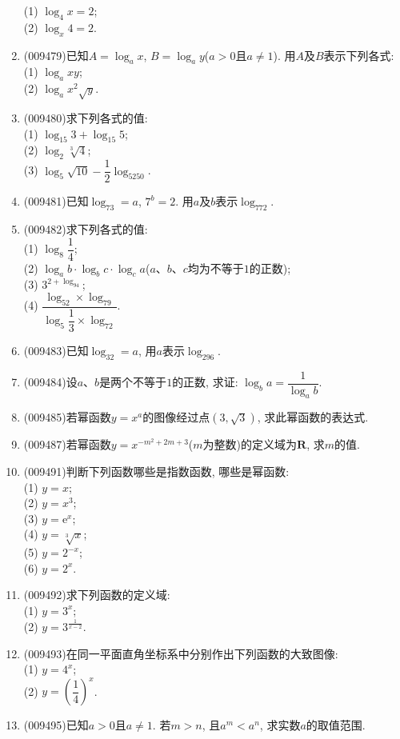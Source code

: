 \documentclass[10pt,a4paper]{article}
\begin{document}
\begin{enumerate}[1.]
(1) $\log_4x=2$;\\
(2) $\log_x4=2$.
\item {\tiny (009479)}已知$A=\log_ax$, $B=\log_ay$($a>0$且$a\ne 1$). 用$A$及$B$表示下列各式:\\
(1) $\log_axy$;\\
(2) $\log_ax^2\sqrt y$.
\item {\tiny (009480)}求下列各式的值:\\
(1) $\log_{15}3+\log_{15}5$;\\
(2) $\log_2\sqrt[3]{4}$;\\
(3) $\log_5\sqrt{10}-\dfrac 12\log_5250$.
\item {\tiny (009481)}已知$\log_73=a$, $7^b=2$. 用$a$及$b$表示$\log_772$.
\item {\tiny (009482)}求下列各式的值:\\
(1) $\log_8\dfrac 14$;\\
(2) $\log_ab\cdot\log_bc\cdot\log_ca$($a$、$b$、$c$均为不等于$1$的正数);\\
(3) $3^{2+\log_94}$;\\
(4) $\dfrac{\log_52\times\log_79}{\log_5\dfrac 13\times\log_72}$.
\item {\tiny (009483)}已知$\log_32=a$, 用$a$表示$\log_296$.
\item {\tiny (009484)}设$a$、$b$是两个不等于$1$的正数, 求证: $\log_ba=\dfrac1{\log_ab}$.
\item {\tiny (009485)}若幂函数$y=x^a$的图像经过点$(3, \sqrt 3)$, 求此幂函数的表达式.
\item {\tiny (009487)}若幂函数$y=x^{-m^2+2m+3}$($m$为整数)的定义域为$\mathbf{R}$, 求$m$的值.
\item {\tiny (009491)}判断下列函数哪些是指数函数, 哪些是幂函数:\\
(1) $y=x$;\\
(2) $y=x^3$;\\
(3) $y=\mathrm{e}^x$;\\
(4) $y=\sqrt[3]{x}$;\\
(5) $y=2^{-x}$;\\
(6) $y=2^x$.
\item {\tiny (009492)}求下列函数的定义域:\\
(1) $y=3^x$;\\
(2) $y=3^{\frac 1{x-2}}$.
\item {\tiny (009493)}在同一平面直角坐标系中分别作出下列函数的大致图像:\\
(1) $y=4^x$;\\
(2) $y=(\dfrac 14)^x$.
\item {\tiny (009495)}已知$a>0$且$a\ne 1$. 若$m>n$, 且$a^m<a^n$, 求实数$a$的取值范围.

\end{enumerate}
\end{document}
